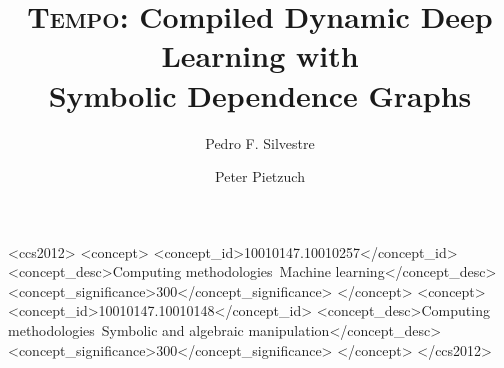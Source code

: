 \documentclass[sigplan,10pt]{acmart}
\newcommand{\sys}{\textsc{Tempo}\xspace}
\begin{document}

\date{}

\title[\sys{}: Compiling Dynamic Deep Learning]{\sys{}: Compiled Dynamic Deep Learning with\\ Symbolic Dependence Graphs}
\author{Pedro F. Silvestre}

\author{Peter Pietzuch}



\begin{CCSXML}
<ccs2012>
   <concept>
       <concept_id>10010147.10010257</concept_id>
       <concept_desc>Computing methodologies~Machine learning</concept_desc>
       <concept_significance>300</concept_significance>
       </concept>
   <concept>
       <concept_id>10010147.10010148</concept_id>
       <concept_desc>Computing methodologies~Symbolic and algebraic manipulation</concept_desc>
       <concept_significance>300</concept_significance>
       </concept>
 </ccs2012>
\end{CCSXML}

\end{document}
